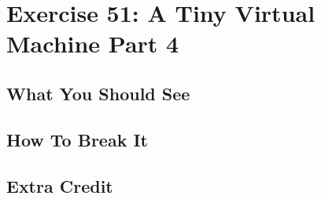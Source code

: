 \chapter{Exercise 51: A Tiny Virtual Machine Part 4}


\section{What You Should See}


\section{How To Break It}


\section{Extra Credit}



